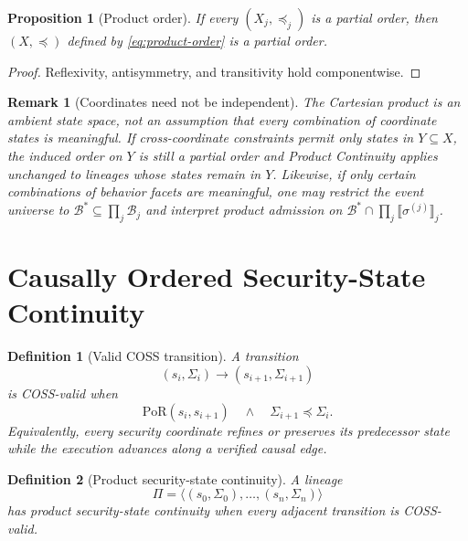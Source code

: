 \documentclass[10pt,twocolumn]{article}
\newcommand{\Model}{\textnormal{\textsc{COSS}}\xspace}
\newcommand{\PoR}{\mathrm{PoR}}
\newcommand{\sem}[1]{\llbracket #1 \rrbracket}
\newcommand{\state}{\Sigma}
\newcommand{\coord}{\sigma}
\newtheorem{definition}{Definition}
\newtheorem{proposition}{Proposition}
\newtheorem{remark}{Remark}
\begin{document}
\begin{proposition}[Product order]
If every $(X_j,\preceq_j)$ is a partial order, then
$(X,\preceq)$ defined by \eqref{eq:product-order} is a partial order.
\end{proposition}

\begin{proof}
Reflexivity, antisymmetry, and transitivity hold componentwise.
\end{proof}

\begin{remark}[Coordinates need not be independent]
The Cartesian product is an ambient state space, not an assumption that every
combination of coordinate states is meaningful. If cross-coordinate constraints
permit only states in $Y\subseteq X$, the induced order on $Y$ is still a
partial order and Product Continuity applies unchanged to lineages whose states
remain in $Y$. Likewise, if only certain combinations of behavior facets are
meaningful, one may restrict the event universe to
$\mathcal{B}^{*}\subseteq\prod_j\mathcal{B}_j$ and interpret product admission
on $\mathcal{B}^{*}\cap\prod_j\sem{\coord^{(j)}}_j$.
\end{remark}

\section{Causally Ordered Security-State Continuity}

\begin{definition}[Valid \Model transition]
A transition
\begin{equation}
  (s_i,\state_i)\longrightarrow(s_{i+1},\state_{i+1})
\end{equation}
is \Model-valid when
\begin{equation}
  \PoR(s_i,s_{i+1})
  \quad\land\quad
  \state_{i+1}\preceq\state_i.
  \label{eq:valid-cosst}
\end{equation}
Equivalently, every security coordinate refines or preserves its predecessor
state while the execution advances along a verified causal edge.
\end{definition}

\begin{definition}[Product security-state continuity]
A lineage
\begin{equation}
  \Pi=\langle(s_0,\state_0),\ldots,(s_n,\state_n)\rangle
\end{equation}
has product security-state continuity when every adjacent transition is
\Model-valid.
\end{definition}
\end{document}
